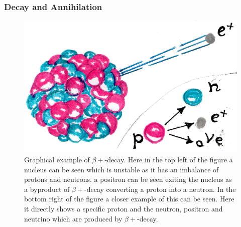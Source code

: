             \subsubsection{Decay and Annihilation} \label{sec:decay_and_annihilation}
                \begin{figure}
                    \centering
                    
                    \includegraphics[width=1.0\linewidth]{figures/background_beta_plus_decay.png}
                    
                    \captionsetup{singlelinecheck=false, justification=raggedright}
                    \caption{Graphical example of $\beta+$-decay. Here in the top left of the figure a nucleus can be seen which is unstable as it has an imbalance of protons and neutrons. a positron can be seen exiting the nucleus as a byproduct of $\beta+$-decay converting a proton into a neutron. In the bottom right of the figure a closer example of this can be seen. Here it directly shows a specific proton and the neutron, positron and neutrino which are produced by $\beta+$-decay.} \label{fig:decay_and_annihilation_beta_plus_decay}
                \end{figure}
                
